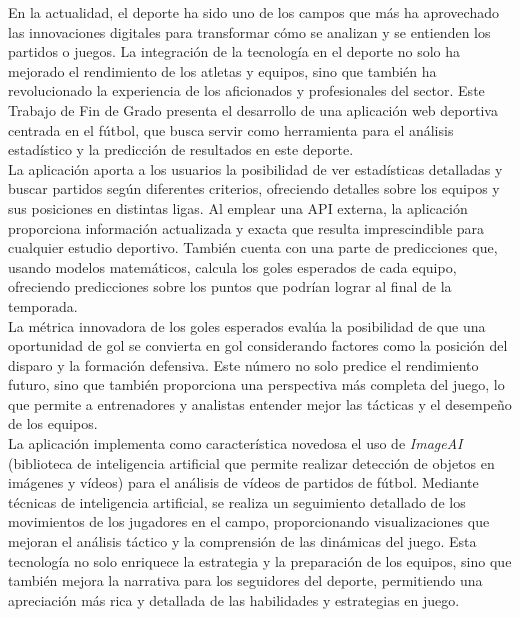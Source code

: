 
En la actualidad, el deporte ha sido uno de los campos que más ha aprovechado las innovaciones digitales para transformar cómo se analizan y se entienden los partidos o juegos. La integración de la tecnología en el deporte no solo ha mejorado el rendimiento de los atletas y equipos, sino que también ha revolucionado la experiencia de los aficionados y profesionales del sector. Este Trabajo de Fin de Grado presenta el desarrollo de una aplicación web deportiva centrada en el fútbol, que busca servir como herramienta para el análisis estadístico y la predicción de resultados en este deporte. \\

La aplicación aporta a los usuarios la posibilidad de ver estadísticas detalladas y buscar partidos según diferentes criterios, ofreciendo detalles sobre los equipos y sus posiciones en distintas ligas. Al emplear una API externa, la aplicación proporciona información actualizada y exacta que resulta imprescindible para cualquier estudio deportivo. También cuenta con una parte de predicciones que, usando modelos matemáticos, calcula los goles esperados de cada equipo, ofreciendo predicciones sobre los puntos que podrían lograr al final de la temporada. \\

La métrica innovadora de los goles esperados evalúa la posibilidad de que una oportunidad de gol se convierta en gol considerando factores como la posición del disparo y la formación defensiva. Este número no solo predice el rendimiento futuro, sino que también proporciona una perspectiva más completa del juego, lo que permite a entrenadores y analistas entender mejor las tácticas y el desempeño de los equipos. \\

La aplicación implementa como característica novedosa el uso de \textit{ImageAI} (biblioteca de inteligencia artificial que permite realizar detección de objetos en imágenes y vídeos) para el análisis de vídeos de partidos de fútbol. Mediante técnicas de inteligencia artificial, se realiza un seguimiento detallado de los movimientos de los jugadores en el campo, proporcionando visualizaciones que mejoran el análisis táctico y la comprensión de las dinámicas del juego. Esta tecnología no solo enriquece la estrategia y la preparación de los equipos, sino que también mejora la narrativa para los seguidores del deporte, permitiendo una apreciación más rica y detallada de las habilidades y estrategias en juego. \\

